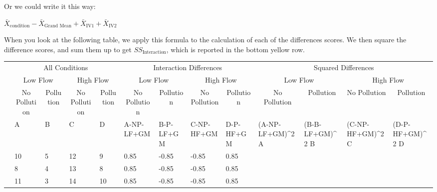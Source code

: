 \documentclass[
  letterpaper,
  DIV=11,
  numbers=noendperiod]{scrreprt}
\begin{document}
Or we could write it this way:

\(\bar{X}_\text{condition} - \bar{X}_\text{Grand Mean} + \bar{X}_\text{IV1} + \bar{X}_\text{IV2}\)

When you look at the following table, we apply this formula to the
calculation of each of the differences scores. We then square the
difference scores, and sum them up to get \(SS_\text{Interaction}\),
which is reported in the bottom yellow row.

\begin{table}
\centering
\begin{tabular}{l|l|l|l|l|l|l|l|l|>{}l|>{}l|>{}l|>{}l}
\hline
\multicolumn{1}{c|}{ } & \multicolumn{4}{c|}{All Conditions} & \multicolumn{4}{c|}{Interaction Differences} & \multicolumn{4}{c}{Squared Differences} \\
\cline{2-5} \cline{6-9} \cline{10-13}
\multicolumn{1}{c|}{ } & \multicolumn{2}{c|}{Low Flow} & \multicolumn{2}{c|}{High Flow} & \multicolumn{2}{c|}{Low Flow} & \multicolumn{2}{c|}{High Flow} & \multicolumn{2}{c|}{Low Flow} & \multicolumn{2}{c}{High Flow} \\
\cline{2-3} \cline{4-5} \cline{6-7} \cline{8-9} \cline{10-11} \cline{12-13}
\multicolumn{1}{c|}{ } & \multicolumn{1}{c|}{No Pollution} & \multicolumn{1}{c|}{Pollution} & \multicolumn{1}{c|}{No Pollution} & \multicolumn{1}{c|}{Pollution} & \multicolumn{1}{c|}{No Pollution} & \multicolumn{1}{c|}{Pollution} & \multicolumn{1}{c|}{No Pollution} & \multicolumn{1}{c|}{Pollution} & \multicolumn{1}{c|}{No Pollution} & \multicolumn{1}{c|}{Pollution} & \multicolumn{1}{c|}{No Pollution} & \multicolumn{1}{c}{Pollution} \\
\cline{2-2} \cline{3-3} \cline{4-4} \cline{5-5} \cline{6-6} \cline{7-7} \cline{8-8} \cline{9-9} \cline{10-10} \cline{11-11} \cline{12-12} \cline{13-13}
  & A & B & C & D & A-NP-LF+GM & B-P-LF+GM & C-NP-HF+GM & D-P-HF+GM & (A-NP-LF+GM)\textasciicircum{}2 A & (B-B-LF+GM)\textasciicircum{}2 B & (C-NP-HF+GM)\textasciicircum{}2 C & (D-P-HF+GM)\textasciicircum{}2 D\\
\hline
 & 10 & 5 & 12 & 9 & 0.85 & -0.85 & -0.85 & 0.85 & \cellcolor{yellow}{0.7225} & \cellcolor{yellow}{0.7225} & \cellcolor{yellow}{0.7225} & \cellcolor{yellow}{0.7225}\\
\hline
 & 8 & 4 & 13 & 8 & 0.85 & -0.85 & -0.85 & 0.85 & \cellcolor{yellow}{0.7225} & \cellcolor{yellow}{0.7225} & \cellcolor{yellow}{0.7225} & \cellcolor{yellow}{0.7225}\\
\hline
 & 11 & 3 & 14 & 10 & 0.85 & -0.85 & -0.85 & 0.85 & \cellcolor{yellow}{0.7225} & \cellcolor{yellow}{0.7225} & \cellcolor{yellow}{0.7225} & \cellcolor{yellow}{0.7225}\\

\end{tabular}
\end{table}
\end{document}
